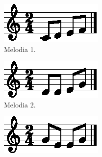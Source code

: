\begin{figure}[!h]
     \centering
     \begin{subfigure}[b]{0.3\textwidth}
         \centering
         \includegraphics[width=\textwidth]{chapters/cap-musicalidade-percepcion/melodia-chars-shape-1-1.eps}
         \caption{Melodia 1.}
         \label{fig:melodia-chars-shape-1-1}
     \end{subfigure}
     \hfill
     \begin{subfigure}[b]{0.3\textwidth}
         \centering
         \includegraphics[width=\textwidth]{chapters/cap-musicalidade-percepcion/melodia-chars-shape-2-1.eps}
         \caption{Melodia 2.}
         \label{fig:melodia-chars-shape-2-1}
     \end{subfigure}
     \hfill
     \begin{subfigure}[b]{0.3\textwidth}
         \centering
         \includegraphics[width=\textwidth]{chapters/cap-musicalidade-percepcion/melodia-chars-shape-3-1.eps}

\end{subfigure}
\end{figure}
